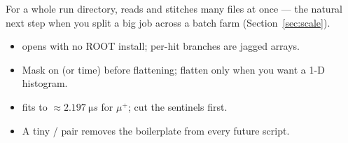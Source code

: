 

\begin{tip}
For a whole run directory,  reads and stitches many files at once --- the natural next step when you split a big job across a batch farm (Section~\ref{sec:scale}).
\end{tip}

\begin{recap}
\begin{itemize}
  \item {} opens  with no ROOT install; per-hit branches are jagged  arrays.
  \item Mask on  (or time) before flattening; flatten only when you want a 1-D histogram.
  \item {} fits to \(\approx\SI{2.197}{\micro s}\) for \(\mu^+\); cut the sentinels first.
  \item A tiny  /  pair removes the boilerplate from every future script.
\end{itemize}
\end{recap}

